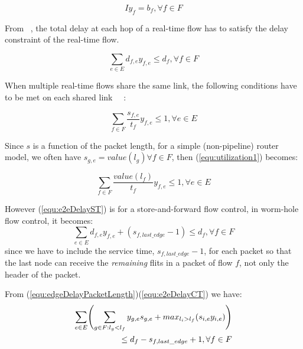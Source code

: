 \documentclass[conference, twocolumn]{IEEEtran}
\theoremstyle{definition}
\begin{document}
\begin{equation}\label{connectivity1} Iy_f=b_f,\forall f \in F
\end{equation}

From ~\cite{Ferrari90ascheme}, the total delay at each hop of a real-time flow
has to satisfy the delay constraint of the real-time flow.

\begin{equation}\label{equ:e2eDelayST}
\sum_{e \in E}d_{f,e}y_{f,e} \leq d_f, \forall f \in F
\end{equation}

When multiple real-time flows share the same link, the following conditions
 have to be met on each shared link ~\cite{Ferrari90ascheme}~\cite{VermaJitter91}:

\begin{equation}\label{equ:utilization1}
\sum_{f \in F}\frac{s_{f,e}}{t_f}y_{f,e} \leq 1, \forall e \in E
\end{equation}

Since $s$ is a function of the packet length, for a simple (non-pipeline) router
model, we often have $s_{g,e}=value(l_g) \forall f \in F$, then
(\ref{equ:utilization1}) becomes:

\begin{equation}\label{equ:utilization2}
\sum_{f \in F}\frac{value(l_f)}{t_f}y_{f,e} \leq 1, \forall e \in E
\end{equation}

However (\ref{equ:e2eDelayST}) is for a store-and-forward flow control, in
worm-hole flow control, it becomes:
\begin{equation}\label{equ:e2eDelayCT}
\sum_{e \in E}d_{f,e}y_{f,e} + (s_{f,last\_edge} - 1) \leq d_f, \forall f \in F
\end{equation}
since we have to include the service time, $s_{f,last\_edge}-1$, for each
packet so that the last node can receive the {\em remaining} flits in a
packet of flow $f$, not only the header of the packet.


From (\ref{equ:edgeDelayPacketLength})(\ref{equ:e2eDelayCT}) we have:
\begin{eqnarray}\label{equ:e2eDelayCTNonPipeline1}
\sum_{e \in E} \Biggl(\sum_{g \in F:l_g <
l_f}y_{g,e}s_{g,e} +max_{l_i>l_f}(s_{i,e}y_{i,e})\Biggr)\notag \\ \leq
d_f-s_{f,last\_edge} + 1, \forall f \in F
\end{eqnarray}
\end{document}
